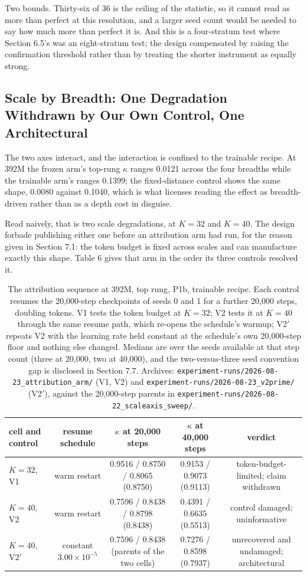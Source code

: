 Two bounds. Thirty-six of 36 is the ceiling of the statistic, so it
cannot read as more than perfect at this resolution, and a larger seed
count would be needed to say how much more than perfect it is. And this
is a four-stratum test where Section 6.5's was an eight-stratum test;
the design compensated by raising the confirmation threshold rather than
by treating the shorter instrument as equally strong.

\subsection{Scale by Breadth: One Degradation Withdrawn by Our Own Control, One Architectural}

The two axes interact, and the interaction is confined to the trainable
recipe. At 392M the frozen arm's top-rung $\kappa$ ranges 0.0121 across
the four breadths while the trainable arm's ranges 0.1399; the
fixed-distance control shows the same shape, 0.0080 against 0.1040,
which is what licenses reading the effect as breadth-driven rather than
as a depth cost in disguise.

Read naively, that is two scale degradations, at $K{=}32$ and $K{=}40$.
The design forbade publishing either one before an attribution arm had
run, for the reason given in Section 7.1: the token budget is fixed
across scales and can manufacture exactly this shape. Table 6 gives that
arm in the order its three controls resolved it.

\begin{table}[t]
\centering
\caption{The attribution sequence at 392M, top rung, P1b, trainable recipe. Each control resumes the 20,000-step checkpoints of seeds 0 and 1 for a further 20,000 steps, doubling tokens. V1 tests the token budget at $K{=}32$; V2 tests it at $K{=}40$ through the same resume path, which re-opens the schedule's warmup; V2$'$ repeats V2 with the learning rate held constant at the schedule's own 20,000-step floor and nothing else changed. Medians are over the seeds available at that step count (three at 20,000, two at 40,000), and the two-versus-three seed convention gap is disclosed in Section 7.7. Archives: \texttt{experiment-runs/2026-08-23\_attribution\_arm/} (V1, V2) and \texttt{experiment-runs/2026-08-23\_v2prime/} (V2$'$), against the 20,000-step parents in \texttt{experiment-runs/2026-08-22\_scaleaxis\_sweep/}.}
\label{tab:scale-breadth}
\small
\begin{tabular}{lcccc}
\toprule
cell and control & resume schedule & $\kappa$ at 20,000 steps & $\kappa$ at 40,000 steps & verdict \\
\midrule
$K{=}32$, V1 & warm restart & 0.9516 / 0.8750 / 0.8065 (0.8750) & 0.9153 / 0.9073 (0.9113) & token-budget-limited; claim withdrawn \\
$K{=}40$, V2 & warm restart & 0.7596 / 0.8438 / 0.8798 (0.8438) & 0.4391 / 0.6635 (0.5513) & control damaged; uninformative \\
$K{=}40$, V2$'$ & constant $3.00 \times 10^{-5}$ & 0.7596 / 0.8438 (parents of the two cells) & 0.7276 / 0.8598 (0.7937) & unrecovered and undamaged; architectural \\
\bottomrule
\end{tabular}
\end{table}

